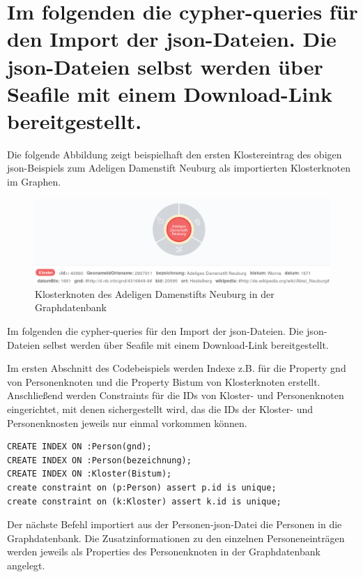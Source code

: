 \documentclass[ngerman,]{scrreprt}
\begin{document}
\chapter{Im folgenden die cypher-queries für den Import der json-Dateien. Die json-Dateien selbst werden über Seafile mit einem Download-Link bereitgestellt.}\label{im-folgenden-die-cypher-queries-fuxfcr-den-import-der-json-dateien.-die-json-dateien-selbst-werden-uxfcber-seafile-mit-einem-download-link-bereitgestellt.}

Die folgende Abbildung zeigt beispielhaft den ersten Klostereintrag des obigen json-Beispiels zum Adeligen Damenstift Neuburg als importierten Klosterknoten im Graphen.

\begin{figure}
\centering
\includegraphics{Bilder/Germania-Sacra-Klosterknoten.png}
\caption{Klosterknoten des Adeligen Damenstifts Neuburg in der Graphdatenbank}
\end{figure}

Im folgenden die cypher-queries für den Import der json-Dateien. Die json-Dateien selbst werden über Seafile mit einem Download-Link bereitgestellt.

Im ersten Abschnitt des Codebeispiels werden Indexe z.B. für die Property gnd von Personenknoten und die Property Bistum von Klosterknoten erstellt. Anschließend werden Constraints für die IDs von Kloster- und Personenknoten eingerichtet, mit denen sichergestellt wird, das die IDs der Kloster- und Personenknosten jeweils nur einmal vorkommen können.

\begin{verbatim}
CREATE INDEX ON :Person(gnd);
CREATE INDEX ON :Person(bezeichnung);
CREATE INDEX ON :Kloster(Bistum);
create constraint on (p:Person) assert p.id is unique;
create constraint on (k:Kloster) assert k.id is unique;
\end{verbatim}

Der nächste Befehl importiert aus der Personen-json-Datei die Personen in die Graphdatenbank. Die Zusatzinformationen zu den einzelnen Personeneinträgen werden jeweils als Properties des Personenknoten in der Graphdatenbank angelegt.
\end{document}
